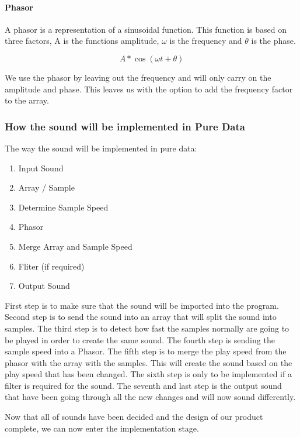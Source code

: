     

\paragraph{Phasor} %
\label{par:phasor}

A phasor is a representation of a sinusoidal function. 
This function is based on three factors, A is the functions amplitude, $\omega$ is the frequency and $\theta$ is the phase.  

\begin{equation}
    A * \cos(\omega t + \theta)
\end{equation}

We use the phasor by leaving out the frequency and will only carry on the amplitude and phase. 
This leaves us with the option to add the frequency factor to the array.



\subsubsection{How the sound will be implemented in Pure Data} %
\label{ssub:how_the_sound_will_be_implemented_in_pure_data}

The way the sound will be implemented in pure data:

\begin{enumerate}
    \item Input Sound
    \item Array / Sample
    \item Determine Sample Speed
    \item Phasor
    \item Merge Array and Sample Speed
    \item Fliter (if required)
    \item Output Sound
\end{enumerate}

First step is to make sure that the sound will be imported into the program. 
Second step is to send the sound into an array that will split the sound into samples. 
The third step is to detect how fast the samples normally are going to be played in order to create the same sound. 
The fourth step is sending the sample speed into a Phasor. 
The fifth step is to merge the play speed from the phasor with the array with the samples. 
This will create the sound based on the play speed that has been changed. 
The sixth step is only to be implemented if a filter is required for the sound. 
The seventh and last step is the output sound that have been going through all the new changes and will now sound differently.

Now that all of sounds have been decided and the design of our product complete, we can now enter the implementation stage. 




